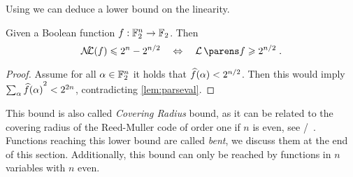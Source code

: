 Using  we can deduce a lower bound on the linearity.
\begin{proposition}
    Given a Boolean function $f : \mathbb{F}_2^n \to \mathbb{F}_2$.
    Then
    \begin{equation*}
        \mathcal{N}\!\!\mathcal{L}(f) \leqslant 2^n - 2^{n/2} \quad \Leftrightarrow \quad \linearity{f} \geqslant 2^{n/2}\;.
    \end{equation*}
\end{proposition}
\begin{proof}
    Assume for all $\alpha \in \mathbb{F}_2^n$ it holds that $\widehat{f}(\alpha) < 2^{n/2}$.
    Then this would imply $\sum_{\alpha} {\widehat{f}(\alpha)}^2 < 2^{2n}$, contradicting \cref{lem:parseval}.
\end{proof}
This bound is also called \emph{Covering Radius} bound, as it can be related to the covering radius of the Reed-Muller code of order one if $n$ is even, see \eg/~\cite[297]{BMM:Carlet10a}.
Functions reaching this lower bound are called \emph{bent}, we discuss them at the end of this section.
Additionally, this bound can only be reached by functions in $n$ variables with $n$ even.

